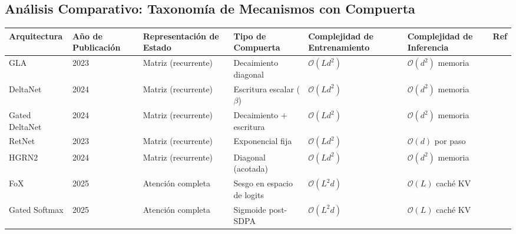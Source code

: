 \documentclass[11pt,a4paper]{article}
\begin{document}
\normalsize

\subsection{Análisis Comparativo: Taxonomía de Mecanismos con Compuerta}

\footnotesize
\begin{longtable}{p{1.8cm}p{1.7cm}p{1.8cm}p{1.6cm}p{2.0cm}p{2.4cm}p{1.3cm}}
\toprule
\textbf{Arquitectura} & \textbf{Año de Publicación} & \textbf{Representación de Estado} & \textbf{Tipo de Compuerta} & \textbf{Complejidad de Entrenamiento} & \textbf{Complejidad de Inferencia} & \textbf{Ref} \\
\midrule
\endhead
GLA & 2023 & Matriz (recurrente) & Decaimiento diagonal & $\mathcal{O}(Ld^2)$ & $\mathcal{O}(d^2)$ memoria & \citep{yang_gla_2023} \\
DeltaNet & 2024 & Matriz (recurrente) & Escritura escalar ($\beta$) & $\mathcal{O}(Ld^2)$ & $\mathcal{O}(d^2)$ memoria & \citep{yang_deltanet_2024} \\
Gated DeltaNet & 2024 & Matriz (recurrente) & Decaimiento + escritura & $\mathcal{O}(Ld^2)$ & $\mathcal{O}(d^2)$ memoria & \citep{yang_gated_deltanet_2024} \\
RetNet & 2023 & Matriz (recurrente) & Exponencial fija & $\mathcal{O}(Ld^2)$ & $\mathcal{O}(d)$ por paso & \citep{sun_retentive_2023} \\
HGRN2 & 2024 & Matriz (recurrente) & Diagonal (acotada) & $\mathcal{O}(Ld^2)$ & $\mathcal{O}(d^2)$ memoria & \citep{qin_hgrn2_2024} \\
FoX & 2025 & Atención completa & Sesgo en espacio de logits & $\mathcal{O}(L^2d)$ & $\mathcal{O}(L)$ caché KV & \citep{lin_forgetting_transformer_2025} \\
Gated Softmax & 2025 & Atención completa & Sigmoide post-SDPA & $\mathcal{O}(L^2d)$ & $\mathcal{O}(L)$ caché KV & \citep{qiu_gated_attention_2025} \\
\bottomrule
\end{longtable}
\normalsize

\medskip
\end{document}

